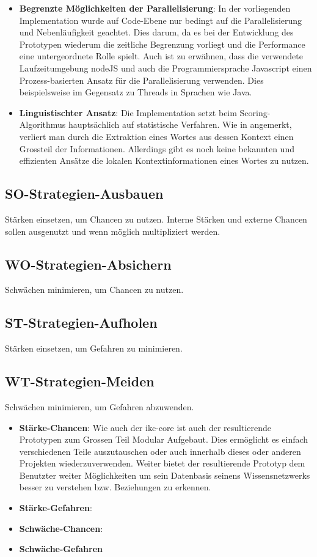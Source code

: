 \begin{itemize}
    \item \textbf{Begrenzte Möglichkeiten der Parallelisierung}: In der vorliegenden Implementation wurde auf Code-Ebene nur bedingt auf die Parallelisierung und Nebenläufigkeit geachtet. Dies darum, da es bei der Entwicklung des Prototypen wiederum die zeitliche Begrenzung vorliegt und die Performance eine untergeordnete Rolle spielt. Auch ist zu erwähnen, dass die verwendete Laufzeitumgebung nodeJS und auch die Programmiersprache Javascript einen Prozess-basierten Ansatz für die Parallelisierung verwenden. Dies beispielsweise im Gegensatz zu Threads in Sprachen wie Java.
    \item \textbf{Linguistischter Ansatz}: Die Implementation setzt beim Scoring-Algorithmus hauptsächlich auf statistische Verfahren. Wie in \cite[S.~1-2]{Zhang2006} angemerkt, verliert man durch die Extraktion eines Wortes aus dessen Kontext einen Grossteil der Informationen. Allerdings gibt es noch keine bekannten und effizienten Ansätze die lokalen Kontextinformationen eines Wortes zu nutzen.
\end{itemize}

\subsection{SO-Strategien-Ausbauen}
Stärken einsetzen, um Chancen zu nutzen. Interne Stärken und externe Chancen sollen ausgenutzt und wenn möglich multipliziert werden.

\subsection{WO-Strategien-Absichern}
Schwächen minimieren, um Chancen zu nutzen.

\subsection{ST-Strategien-Aufholen}
Stärken einsetzen, um Gefahren zu minimieren.

\subsection{WT-Strategien-Meiden}
Schwächen minimieren, um Gefahren abzuwenden.


\begin{itemize}
    \item \textbf{Stärke-Chancen}: Wie auch der \gls{ikc-core} ist auch der resultierende Prototypen zum Grossen Teil Modular Aufgebaut. Dies ermöglicht es einfach verschiedenen Teile auszutauschen oder auch innerhalb dieses oder anderen Projekten wiederzuverwenden. Weiter bietet der resultierende Prototyp dem Benutzter weiter Möglichkeiten um sein Datenbasis seinens Wissensnetzwerks besser zu verstehen bzw. Beziehungen zu erkennen. 
    \item \textbf{Stärke-Gefahren}:  
    \item \textbf{Schwäche-Chancen}: 
    \item \textbf{Schwäche-Gefahren}
\end{itemize}

